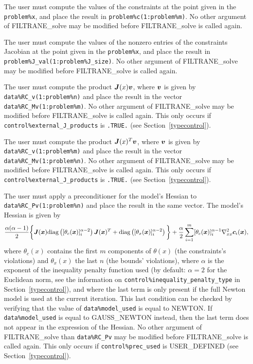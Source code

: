 \documentclass{galahad}
\newcommand{\packagename}{FILTRANE}
\newcommand{\sym}{\sf\small}
\begin{document}
\begin{description}
 The user must compute the values of the constraints at the
point given in the {\tt problem\%x}, and place the result
in {\tt problem\%c(1:problem\%m)}.
No other argument of \packagename\_solve may be modified 
before \packagename\_solve is called again.
 
 The user must compute the values of the nonzero entries of the
constraints Jacobian at the point given in the {\tt problem\%x}, and place 
the result in {\tt problem\%J\_val(1:problem\%J\_size)}.
No other argument of \packagename\_solve may be modified 
before \packagename\_solve is called again.

 The user must compute the product ${\bm{J}}(x) {\bm{v}}$, where
${\bm{v}}$ is given by {\tt data\%RC\_v(1:problem\%n)} and place the result in
the vector {\tt data\%RC\_Mv(1:problem\%m)}. No other argument of 
\packagename\_solve may be modified before \packagename\_solve is called
again. 
This only occurs if {\tt control\%external\_J\_products} is {\tt .TRUE.} 
(see Section~\ref{typecontrol}).

 The user must compute the product ${\bm{J}}(x)^T {\bm{v}}$, where
${\bm{v}}$ is given by {\tt data\%RC\_v(1:problem\%m)} and place the result in
the vector {\tt data\%RC\_Mv(1:problem\%n)}. No other argument of 
\packagename\_solve may be modified before \packagename\_solve is called
again. 
This only occurs if {\tt control\%external\_J\_products} is {\tt .TRUE.} 
(see Section~\ref{typecontrol}).

 The user must apply a
preconditioner for the model's Hessian to {\tt data\%RC\_Pv(1:problem\%n)} and
place the result in the same vector.  The model's Hessian is given by
\[
\frac{\alpha(\alpha - 1)}{2} \bigg\{
{\bm{J}}({\bm{x}}) {\rm diag}\left([\theta_c({\bm{x}})]_i^{\alpha-2}\right) {\bm{J}}({\bm{x}})^T 
+ {\rm diag}\left( [\theta_x({\bm{x}})]_i^{\alpha-2} \right)
\bigg\}
+ \frac{\alpha}{2} \sum_{i=1}^m [\theta_c({\bm{x}})]_i^{\alpha-1}
  \nabla_{xx}^2 {\bm{c}}_i({\bm{x}}), 
\]
where $\theta_c(x)$ contains the first $m$ components of $\theta(x)$ (the
constraints's violations) and $\theta_x(x)$ the last $n$ (the bounds'
violations), where $\alpha$ is the exponent of the inequality penalty
function used (by default: $\alpha = 2$ for the Euclidean norm, see the
information on {\tt control\%inequality\_penalty\_type} in
Section~\ref{typecontrol}), and where the last term is only present if the full
Newton model is used at the current iteration.  This last condition can be
checked by verifying that the value of {\tt data\%model\_used} is equal to
{\sym NEWTON}. If {\tt data\%model\_used} is equal to {\sym GAUSS\_NEWTON}
instead, then the last term does not appear in the expression of the Hessian.
No other argument of \packagename\_solve than {\tt data\%RC\_Pv} may be
modified  before \packagename\_solve is called again.
This only occurs if {\tt control\%prec\_used} is {\sym USER\_DEFINED} 
(see Section~\ref{typecontrol}).


\end{description}
\end{document}
